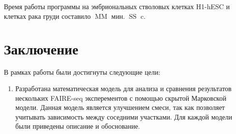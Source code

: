 \documentclass{matmex-diploma-custom}
\begin{document}
Время работы программы на эмбриональных стволовых клетках H1-hESC и клетках рака груди составило $\operatorname{MM}$ мин. $\operatorname{SS}$ c.

\section*{Заключение}
В рамках работы были достигнуты следующие цели:
\begin{enumerate}
    \item Разработана математическая модель для анализа и сравнения результатов нескольких FAIRE-seq эксперементов с помощью скрытой Марковской модели. Данная модель является улучшением смеси, так как позволяет учитывать зависимость между соседними участками. Для каждой модели были приведены описание и обоснование.
\end{enumerate}
 


\end{document}

